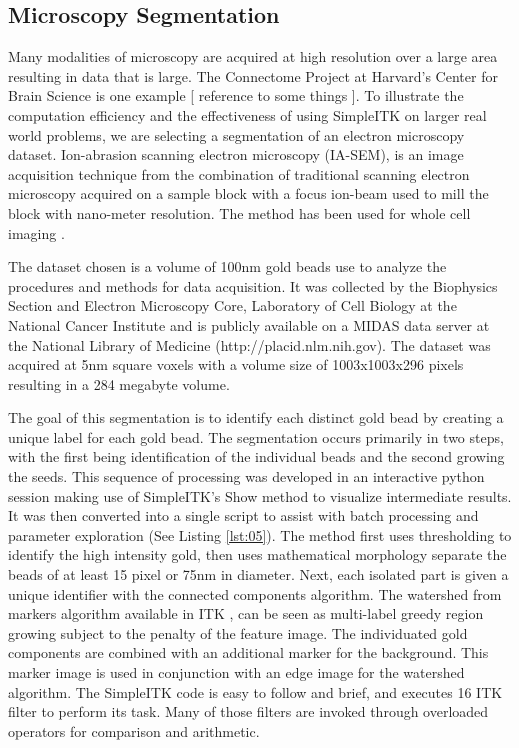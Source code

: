 \documentclass{frontiersMED} %
\begin{document}
\subsection{Microscopy Segmentation}
Many modalities of microscopy are acquired at high resolution over a
large area resulting in data that is large. The Connectome Project at
Harvard’s Center for Brain Science is one example [ reference to some
  things ]. To illustrate the computation efficiency and the
effectiveness of using SimpleITK on larger real world problems, we are
selecting a segmentation of an electron microscopy
dataset. Ion-abrasion scanning electron microscopy (IA-SEM), is an
image acquisition technique from the combination of traditional
scanning electron microscopy acquired on a sample block with a focus
ion-beam used to mill the block with nano-meter resolution. The method
has been used for whole cell imaging \cite{Murphy2011}. 

The dataset chosen is a volume of 100nm gold beads  use to analyze the
procedures and methods for data acquisition. It was collected by the
Biophysics Section and Electron Microscopy Core, Laboratory of Cell
Biology at the National Cancer Institute and is publicly available on
a MIDAS data server at the National Library of Medicine
(http://placid.nlm.nih.gov). The dataset was acquired at 5nm square
voxels with a volume size of 1003x1003x296 pixels resulting in a 284
megabyte volume. 
	
The goal of this segmentation is to identify each distinct gold bead
by creating a unique label for each gold bead. The segmentation occurs
primarily in two steps, with the first being  identification of the
individual beads and the second growing the seeds. This sequence of
processing was developed in an interactive python session making use
of SimpleITK’s Show method to visualize intermediate results. It was
then converted into a single script to assist with batch processing
and parameter exploration (See Listing \ref{lst:05}). The method first uses
thresholding to identify the high intensity gold, then uses
mathematical morphology separate the beads of at least 15 pixel or
75nm in diameter. Next, each isolated part is given a unique
identifier with the connected components algorithm. The watershed from
markers algorithm available in ITK \cite{Beare2006}, can be seen as
multi-label greedy region growing subject to the penalty of the
feature image. The individuated gold components are combined with an
additional marker for the background. This marker image is used in
conjunction with an edge image for the watershed algorithm. The
SimpleITK code is easy to follow and brief, and executes 16 ITK filter
to perform its task. Many of those filters are invoked through
overloaded operators for comparison and arithmetic. 
\end{document}
